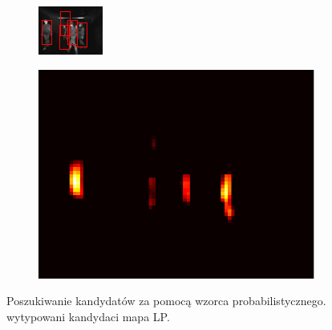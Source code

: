 \begin{figure}[h]
\centering
\begin{subfigure}{0.32\textwidth}
\centering
\includegraphics[width=0.9\linewidth]{images/sampleTemplateDetection}
\subcaption{\label{fig:sampleTemplateDetection}}
\end{subfigure}
\begin{subfigure}{0.32\textwidth}
\centering
\includegraphics[width=0.9\linewidth]{images/sampleLP}
\subcaption{\label{fig:sampleLP}}
\end{subfigure}

\caption[Poszukiwanie kandydatów za pomocą wzorca probabilistycznego.]{Poszukiwanie kandydatów za pomocą wzorca probabilistycznego. \protect{} wytypowani kandydaci \protect{} mapa LP.}
\end{figure}

